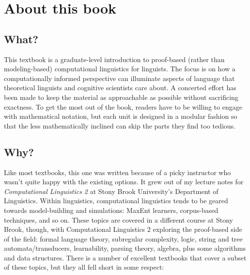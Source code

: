 \chapter*{About this book}


\section*{What?}

This textbook is a graduate-level introduction to proof-based (rather than modeling-based) computational linguistics for linguists.
The focus is on how a computationally informed perspective can illuminate aspects of language that theoretical linguists and cognitive scientists care about.
A concerted effort has been made to keep the material as approachable as possible without sacrificing exactness.
To get the most out of the book, readers have to be willing to engage with mathematical notation, but each unit is designed in a modular fashion so that the less mathematically inclined can skip the parts they find too tedious.


\section*{Why?}

Like most textbooks, this one was written because of a picky instructor who wasn't quite happy with the existing options.
It grew out of my lecture notes for \emph{Computational Linguistics 2} at Stony Brook University's Department of Linguistics.
Within linguistics, computational linguistics tends to be geared towards model-building and simulations: MaxEnt learners, corpus-based techniques, and so on.
These topics are covered in a different course at Stony Brook, though, with Computational Linguistics 2 exploring the proof-based side of the field: formal language theory, subregular complexity, logic, string and tree automata\slash transducers, learnability, parsing theory, algebra, plus some algorithms and data structures.
There is a number of excellent textbooks that cover a subset of these topics, but they all fell short in some respect:

